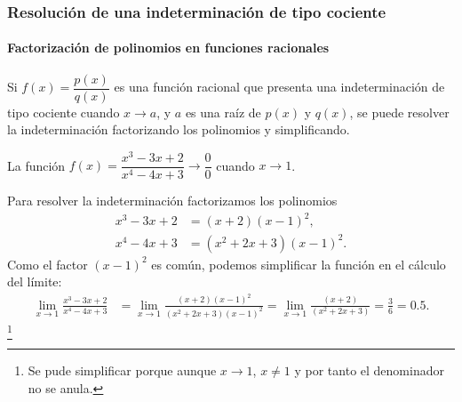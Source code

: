 \begin{frame}
\frametitle{Resolución de una indeterminación de tipo cociente}
\framesubtitle{Factorización de polinomios en funciones racionales}
Si $f(x)=\dfrac{p(x)}{q(x)}$ es una función racional que presenta una indeterminación de tipo cociente cuando $x\rightarrow a$, y $a$ es una raíz de $p(x)$ y $q(x)$, se puede resolver la indeterminación factorizando los polinomios y simplificando.

 La función $f(x)=\dfrac{x^3-3x+2}{x^4-4x+3}\rightarrow \dfrac{0}{0}$ cuando $x\rightarrow 1$.

Para resolver la indeterminación factorizamos los polinomios
\begin{align*}
  x^3-3x+2 &= (x+2)(x-1)^2,\\
  x^4-4x+3 &= (x^2+2x+3)(x-1)^2.
\end{align*}
Como el factor $(x-1)^2$ es común, podemos simplificar la función en el cálculo del límite:
\begin{align*}
\lim_{x\rightarrow 1}\frac{x^3-3x+2}{x^4-4x+3} &=
\lim_{x\rightarrow 1}\frac{(x+2)(x-1)^2}{(x^2+2x+3)(x-1)^2} =
\lim_{x\rightarrow 1}\frac{(x+2)}{(x^2+2x+3)} =\frac{3}{6}=0.5.
\end{align*}\footnote{Se pude simplificar porque aunque $x\rightarrow 1$, $x\neq 1$ y por tanto el denominador no se anula.}
\end{frame}


